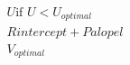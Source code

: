 \documentclass[preview]{standalone}
\begin{document}
\begin{align*}
U                     \text{if } U < U_{optimal} \\
            Rintercept + Palopel \\
            V_{optimal}
\end{align*}
\end{document}

